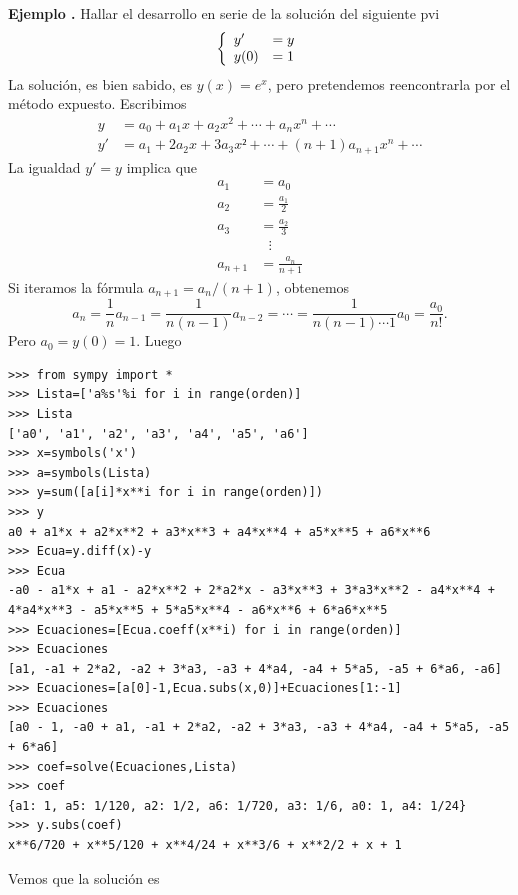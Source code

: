 \documentclass{article}
\newcounter{ejemplo_cont}
\newenvironment{ejemplo}{\noindent\textbf{Ejemplo  \arabic{ejemplo_cont}.} }{\addtocounter{ejemplo_cont}{1}}
\begin{document}
\begin{ejemplo} Hallar el desarrollo en serie de la solución del siguiente pvi 
\[\left\{\begin{array}{l l} y'&=y\\ y(0)&=1\end{array}\right.\]
La solución, es bien sabido, es $y(x)=e^x$,  pero pretendemos reencontrarla por el método expuesto. Escribimos
\[\begin{split}
   y&=a_0+a_1x+a_2x^2+\cdots+a_nx^n+\cdots\\
   y'&=a_1+2a_2x+3a_3x²+\cdots+(n+1)a_{n+1}x^n+\cdots
  \end{split}
\]
La igualdad $y'=y$ implica que 
\[\begin{split}
   a_1&=a_0\\
   a_2&=\frac{a_1}{2}\\
   a_3&=\frac{a_2}{3}\\
      &\,\,\,\,\vdots \\
   a_{n+1}&=\frac{a_{n}}{n+1}
 \end{split}
\]
Si iteramos la fórmula $a_{n+1}=a_{n}/(n+1)$, obtenemos 
\[a_n=\frac{1}{n}a_{n-1}=\frac{1}{n(n-1)}a_{n-2}=\cdots=\frac{1}{n(n-1)\cdots 1}a_{0}=\frac{a_0}{n!}.\]
Pero $a_0=y(0)=1$. Luego 




\begin{lstlisting}
>>> from sympy import *
>>> Lista=['a%s'%i for i in range(orden)]
>>> Lista
['a0', 'a1', 'a2', 'a3', 'a4', 'a5', 'a6']
>>> x=symbols('x')
>>> a=symbols(Lista)
>>> y=sum([a[i]*x**i for i in range(orden)])
>>> y
a0 + a1*x + a2*x**2 + a3*x**3 + a4*x**4 + a5*x**5 + a6*x**6
>>> Ecua=y.diff(x)-y
>>> Ecua
-a0 - a1*x + a1 - a2*x**2 + 2*a2*x - a3*x**3 + 3*a3*x**2 - a4*x**4 + 4*a4*x**3 - a5*x**5 + 5*a5*x**4 - a6*x**6 + 6*a6*x**5
>>> Ecuaciones=[Ecua.coeff(x**i) for i in range(orden)]
>>> Ecuaciones
[a1, -a1 + 2*a2, -a2 + 3*a3, -a3 + 4*a4, -a4 + 5*a5, -a5 + 6*a6, -a6]
>>> Ecuaciones=[a[0]-1,Ecua.subs(x,0)]+Ecuaciones[1:-1]
>>> Ecuaciones
[a0 - 1, -a0 + a1, -a1 + 2*a2, -a2 + 3*a3, -a3 + 4*a4, -a4 + 5*a5, -a5 + 6*a6]
>>> coef=solve(Ecuaciones,Lista)
>>> coef
{a1: 1, a5: 1/120, a2: 1/2, a6: 1/720, a3: 1/6, a0: 1, a4: 1/24}
>>> y.subs(coef)
x**6/720 + x**5/120 + x**4/24 + x**3/6 + x**2/2 + x + 1
\end{lstlisting}


Vemos que la solución es 
\end{ejemplo}
\end{document}

